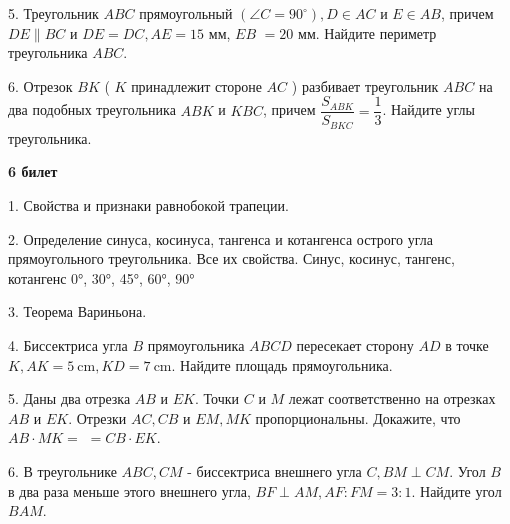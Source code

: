 5. Треугольник $A B C$ прямоугольный $\left(\angle C=90^{\circ}\right), D \in A C$ и $E \in A B$, причем $D E \| B C$ и $D E=D C, A E=15$ мм, $E B$ $=20$ мм. Найдите периметр треугольника $A B C$.


6. Отрезок $B K$ ( $K$ принадлежит стороне $A C$ ) разбивает треугольник $A B C$ на два подобных треугольника $A B K$ и $K B C$, причем $\dfrac{S_{A B K}}{S_{B K C}}=\dfrac{1}{3}$. Найдите углы треугольника.

\newpage
\centerline{\bf \Huge }
\centerline{\bf \Huge 6 билет}
\centerline{\bf \Huge }

1. Свойства и признаки равнобокой трапеции.

2. Определение синуса, косинуса, тангенса и котангенса острого угла
прямоугольного треугольника. Все их свойства. Синус, косинус, тангенс, котангенс 0°, 30°,  45°, 60°, 90°

3. Теорема Вариньона.

4. Биссектриса угла $B$ прямоугольника $A B C D$ пересекает сторону $A D$ в точке $K, A K=5 \mathrm{~cm}, K D=7 \mathrm{~cm}$. Найдите площадь прямоугольника.

5. Даны два отрезка $A B$ и $E K$. Точки $C$ и $M$ лежат соответственно на отрезках $A B$ и $E K$. Отрезки $A C, C B$ и $E M, M K$ пропорциональны. Докажите, что $A B \cdot M K=$ $=C B \cdot E K$.

6. В треугольнике $A B C, C M$ - биссектриса внешнего угла $C, B M \perp C M$. Угол $B$ в два раза меньше этого внешнего угла, $B F \perp A M, A F: F M=3: 1$. Найдите угол $B A M$.

